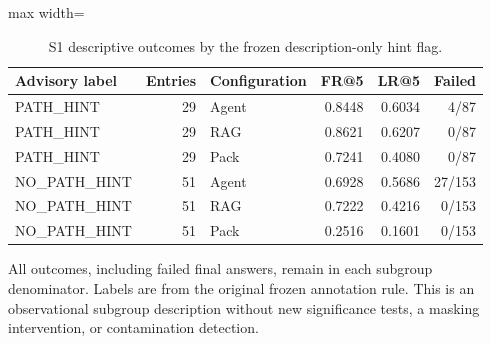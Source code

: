 \begin{table}[t]
\centering\small
\caption{S1 descriptive outcomes by the frozen description-only hint flag.}\label{tab:hint-subgroups}
\begin{adjustbox}{max width=\textwidth}\begin{tabular}{lrlrrr}
\toprule
Advisory label & Entries & Configuration & FR@5 & LR@5 & Failed \\
\midrule
PATH\_HINT & 29 & Agent & 0.8448 & 0.6034 & 4/87 \\
PATH\_HINT & 29 & RAG & 0.8621 & 0.6207 & 0/87 \\
PATH\_HINT & 29 & Pack & 0.7241 & 0.4080 & 0/87 \\
NO\_PATH\_HINT & 51 & Agent & 0.6928 & 0.5686 & 27/153 \\
NO\_PATH\_HINT & 51 & RAG & 0.7222 & 0.4216 & 0/153 \\
NO\_PATH\_HINT & 51 & Pack & 0.2516 & 0.1601 & 0/153 \\
\bottomrule
\end{tabular}\end{adjustbox}
\par\vspace{3pt}\begin{minipage}{\textwidth}\footnotesize All outcomes, including failed final answers, remain in each subgroup denominator. Labels are from the original frozen annotation rule. This is an observational subgroup description without new significance tests, a masking intervention, or contamination detection.\end{minipage}
\end{table}
